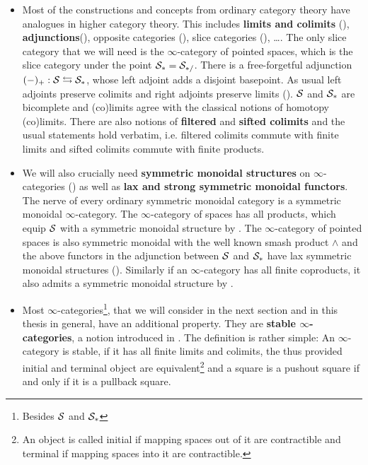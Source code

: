 \begin{itemize}
    \item Most of the constructions and concepts from ordinary category theory have analogues in higher category theory. This includes \textbf{limits and colimits} (\cite[Section~1.2.3, Chapter~4]{HigherToposTheory}), \textbf{adjunctions}(\cite[\href{https://kerodon.net/tag/02EJ}{Tag 02EJ}]{kerodon}), opposite categories (\cite[Section~1.2.1]{HigherToposTheory}), slice categories (\cite[Section~1.2.9]{HigherToposTheory}), \dots. The only slice category that we will need is the $\infty$-category of pointed spaces, which is the slice category under the point $\mathcal{S}_*=\mathcal{S}_{*/}$. There is a free-forgetful adjunction $(-)_+:\mathcal{S}\leftrightarrows \mathcal{S}_*$, whose left adjoint adds a disjoint basepoint. As usual left adjoints preserve colimits and right adjoints preserve limits (\cite[Proposition~5.2.3.5]{HigherToposTheory}). $\mathcal{S}$ and $\mathcal{S}_*$ are bicomplete and (co)limits agree with the classical notions of homotopy (co)limits. There are also notions of \textbf{filtered }and \textbf{sifted colimits }and the usual statements hold verbatim, i.e. filtered colimits commute with finite limits and sifted colimits commute with finite products.
    \item We will also crucially need \textbf{symmetric monoidal structures} on $\infty$-categories (\cite[Definition~2.0.0.7]{lurie2017higher}) as well as \textbf{lax and strong symmetric monoidal functors}. The nerve of every ordinary symmetric monoidal category is a symmetric monoidal $\infty$-category.
    The $\infty$-category of spaces has all products, which equip $\mathcal{S}$ with a symmetric monoidal structure by \cite[Section~2.4.1]{lurie2017higher}.
    The $\infty$-category of pointed spaces is also symmetric monoidal with the well known smash product $\wedge$ and the above functors in the adjunction between $\mathcal{S}$ and $\mathcal{S}_*$ have lax symmetric monoidal structures (\cite[Theorem~2.2.2.4]{lurie2017higher}). Similarly if an $\infty$-category has all finite coproducts, it also admits a symmetric monoidal structure by \cite[Section~2.4.3]{lurie2017higher}. 
    \item Most $\infty$-categories\footnote{Besides $\mathcal{S}$ and $\mathcal{S}_*$}, that we will consider in the next section and in this thesis in general, have an additional property. They are \textbf{stable $\infty$-categories}, a notion introduced in \cite[Section~1.1]{lurie2017higher}.
    The definition is rather simple: An $\infty$-category is stable, if it has all finite limits and colimits, the thus provided initial and terminal object are equivalent\footnote{An object is called initial if mapping spaces out of it are contractible and terminal if mapping spaces into it are contractible.} and a square is a pushout square if and only if it is a pullback square. 

\end{itemize}

